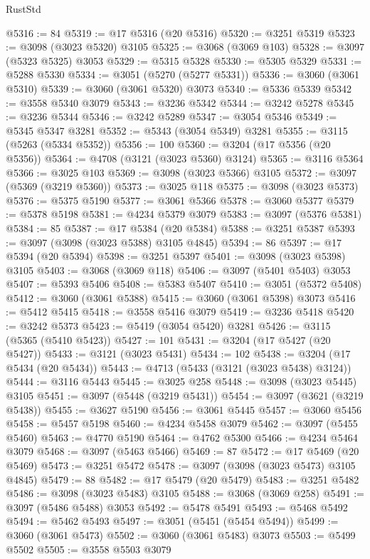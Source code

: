 \begin{lexlean}{RustStd}
\begin{coremodule}
@5316 := 84
@5319 := @17 @5316 (@20 @5316)
@5320 := @3251 @5319
@5323 := @3098 (@3023 @5320) @3105
@5325 := @3068 (@3069 @103)
@5328 := @3097 (@5323 @5325) @3053
@5329 := @5315 @5328
@5330 := @5305 @5329
@5331 := @5288 @5330
@5334 := @3051 (@5270 (@5277 @5331))
@5336 := @3060 (@3061 @5310)
@5339 := @3060 (@3061 @5320) @3073
@5340 := @5336 @5339
@5342 := @3558 @5340 @3079
@5343 := @3236 @5342
@5344 := @3242 @5278
@5345 := @3236 @5344
@5346 := @3242 @5289
@5347 := @3054 @5346
@5349 := @5345 @5347 @3281
@5352 := @5343 (@3054 @5349) @3281
@5355 := @3115 (@5263 (@5334 @5352))
@5356 := 100
@5360 := @3204 (@17 @5356 (@20 @5356))
@5364 := @4708 (@3121 (@3023 @5360) @3124)
@5365 := @3116 @5364
@5366 := @3025 @103
@5369 := @3098 (@3023 @5366) @3105
@5372 := @3097 (@5369 (@3219 @5360))
@5373 := @3025 @118
@5375 := @3098 (@3023 @5373)
@5376 := @5375 @5190
@5377 := @3061 @5366
@5378 := @3060 @5377
@5379 := @5378 @5198
@5381 := @4234 @5379 @3079
@5383 := @3097 (@5376 @5381)
@5384 := 85
@5387 := @17 @5384 (@20 @5384)
@5388 := @3251 @5387
@5393 := @3097 (@3098 (@3023 @5388) @3105 @4845)
@5394 := 86
@5397 := @17 @5394 (@20 @5394)
@5398 := @3251 @5397
@5401 := @3098 (@3023 @5398) @3105
@5403 := @3068 (@3069 @118)
@5406 := @3097 (@5401 @5403) @3053
@5407 := @5393 @5406
@5408 := @5383 @5407
@5410 := @3051 (@5372 @5408)
@5412 := @3060 (@3061 @5388)
@5415 := @3060 (@3061 @5398) @3073
@5416 := @5412 @5415
@5418 := @3558 @5416 @3079
@5419 := @3236 @5418
@5420 := @3242 @5373
@5423 := @5419 (@3054 @5420) @3281
@5426 := @3115 (@5365 (@5410 @5423))
@5427 := 101
@5431 := @3204 (@17 @5427 (@20 @5427))
@5433 := @3121 (@3023 @5431)
@5434 := 102
@5438 := @3204 (@17 @5434 (@20 @5434))
@5443 := @4713 (@5433 (@3121 (@3023 @5438) @3124))
@5444 := @3116 @5443
@5445 := @3025 @258
@5448 := @3098 (@3023 @5445) @3105
@5451 := @3097 (@5448 (@3219 @5431))
@5454 := @3097 (@3621 (@3219 @5438))
@5455 := @3627 @5190
@5456 := @3061 @5445
@5457 := @3060 @5456
@5458 := @5457 @5198
@5460 := @4234 @5458 @3079
@5462 := @3097 (@5455 @5460)
@5463 := @4770 @5190
@5464 := @4762 @5300
@5466 := @4234 @5464 @3079
@5468 := @3097 (@5463 @5466)
@5469 := 87
@5472 := @17 @5469 (@20 @5469)
@5473 := @3251 @5472
@5478 := @3097 (@3098 (@3023 @5473) @3105 @4845)
@5479 := 88
@5482 := @17 @5479 (@20 @5479)
@5483 := @3251 @5482
@5486 := @3098 (@3023 @5483) @3105
@5488 := @3068 (@3069 @258)
@5491 := @3097 (@5486 @5488) @3053
@5492 := @5478 @5491
@5493 := @5468 @5492
@5494 := @5462 @5493
@5497 := @3051 (@5451 (@5454 @5494))
@5499 := @3060 (@3061 @5473)
@5502 := @3060 (@3061 @5483) @3073
@5503 := @5499 @5502
@5505 := @3558 @5503 @3079

\end{coremodule}
\end{lexlean}
